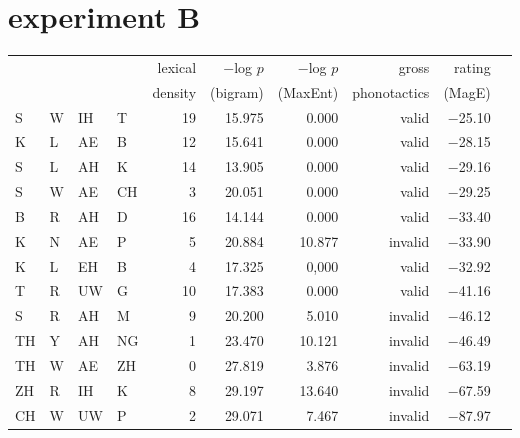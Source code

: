 \section{\citet{Greenberg1964} experiment B}  

\begin{longtable}{l@{ } l@{ } l@{ } l r r r r r r} 
\toprule
  &   &    &     & lexical & $-$log $p$ & $-$log $p$ & gross & rating \\
&&&& density & (bigram) & (MaxEnt) & phonotactics & (MagE) \\
\midrule
S  & W & IH & T  & 19 & 15.975 & 0.000  & valid   & $-$25.10 \\
K  & L & AE & B  & 12 & 15.641 & 0.000  & valid   & $-$28.15 \\
S  & L & AH & K  & 14 & 13.905 & 0.000  & valid   & $-$29.16 \\
S  & W & AE & CH &  3 & 20.051 & 0.000  & valid   & $-$29.25 \\
B  & R & AH & D  & 16 & 14.144 & 0.000  & valid   & $-$33.40 \\
K  & N & AE & P  &  5 & 20.884 & 10.877 & invalid & $-$33.90 \\
K  & L & EH & B  &  4 & 17.325 & 0,000  & valid   & $-$32.92 \\
T  & R & UW & G  & 10 & 17.383 & 0.000  & valid   & $-$41.16 \\
S  & R & AH & M  &  9 & 20.200 & 5.010  & invalid & $-$46.12 \\
TH & Y & AH & NG &  1 & 23.470 & 10.121 & invalid & $-$46.49 \\
TH & W & AE & ZH &  0 & 27.819 & 3.876  & invalid & $-$63.19 \\
ZH & R & IH & K  &  8 & 29.197 & 13.640 & invalid & $-$67.59 \\
CH & W & UW & P  &  2 & 29.071 & 7.467  & invalid & $-$87.97 \\
\bottomrule
\end{longtable}
